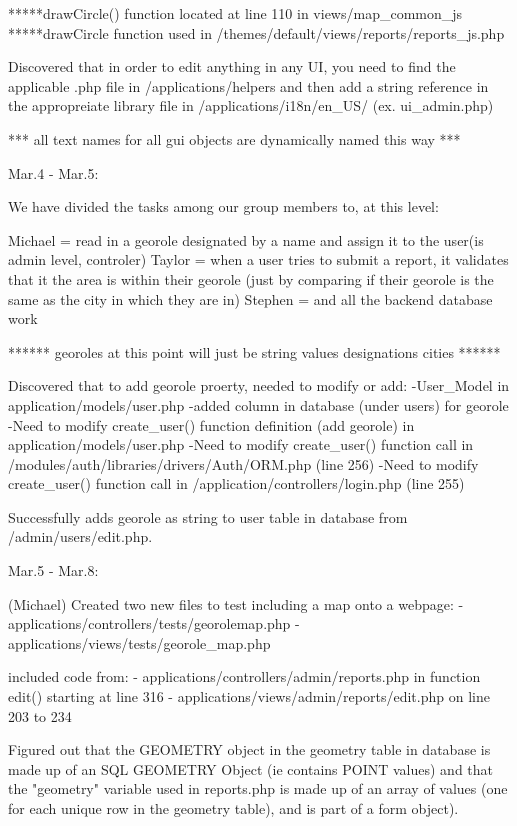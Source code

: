 \documentclass{article}
\begin{document}
	*****drawCircle() function located at line 110 in views/map_common_js	
	*****drawCircle function used in /themes/default/views/reports/reports_js.php

	Discovered that in order to edit anything in any UI, you need to find the applicable .php file in
	/applications/helpers and then add a string reference in the appropreiate
	library file in /applications/i18n/en_US/ (ex. ui_admin.php)
		
	*** all text names for all gui objects are dynamically named this way ***

Mar.4 - Mar.5:

	We have divided the tasks among our group members to, at this level:
	
	Michael = read in a georole designated by a name and assign it to the user(is admin level, controler)
	Taylor = when a user tries to submit a report, it validates that it the area is within their georole (just by
	comparing if their georole is the same as the city in which they are in)
	Stephen = and all the backend database work

	****** georoles at this point will just be string values designations cities ******

        Discovered that to add georole proerty, needed to modify or add: 
	     -User_Model in application/models/user.php
	     -added column in database (under users) for georole
             -Need to modify create_user() function definition (add georole) in application/models/user.php
	     -Need to modify create_user() function call in /modules/auth/libraries/drivers/Auth/ORM.php (line 256)
	     -Need to modify create_user() function call in /application/controllers/login.php (line 255)
    
        Successfully adds georole as string to user table in database from /admin/users/edit.php.

Mar.5 - Mar.8:
    
    (Michael) Created two new files to test including a map onto a webpage:
       - applications/controllers/tests/georolemap.php
       - applications/views/tests/georole_map.php
        
    included code from:
       - applications/controllers/admin/reports.php in function edit() starting at line 316
       - applications/views/admin/reports/edit.php on line 203 to 234
        
    Figured out that the GEOMETRY object in the geometry table in database is made up of an SQL GEOMETRY Object
    (ie contains POINT values) and that the "geometry" variable used in reports.php is made up of an array of 
    values (one for each unique row in the geometry table), and is part of a form object).            
\end{document}
